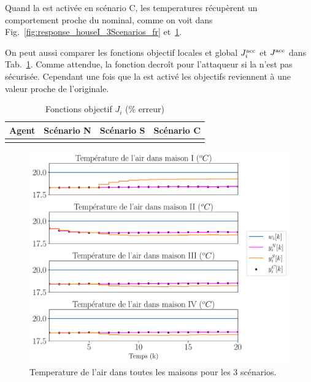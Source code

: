 \documentclass[../main.tex]{subfiles}
\begin{document}
Quand la \rpdmpcss{} est activée en scénario C, les temperatures récupèrent un comportement proche du nominal, comme on voit dans Fig.~\ref{fig:response_houseI_3Scenarios_fr} et~\ref{fig:response_housesII_to_IV_3Scenarios_fr}.


On peut aussi comparer les fonctions objectif locales et global $J_{i}^{\text{acc}}$ et $J^{\text{acc}}$ dans Tab.~\ref{tab:eq_costsGlobalLocal_fr}.
Comme attendue, la fonction decroît pour l'attaqueur si la \dmpc{} n'est pas sécurisée. Cependant une fois que la \rpdmpcss{} est activé les objectifs reviennent à une valeur proche de l'originale.

\begin{table}[h]
  \centering
  \caption{Fonctions objectif $J_{i}$ (\% erreur)}\label{tab:eq_costsGlobalLocal_fr}
  \begin{tabular}[t]{cccc}
    \toprule
    Agent  & Scénario N& Scénario S & Scénario C\\
    \midrule
    \\
    \bottomrule
  \end{tabular}
\end{table}

\begin{figure}[H]
  \centering
 \includegraphics[width=.7\textwidth,trim=0 .3cm 0 .2cm,clip]{../img/resilient_eq/ErrorWX_command_normErrH_all_houses_fr.pdf}
  \caption{Temperature de l'air dans toutes les maisons pour les 3 scénarios.}\label{fig:response_housesII_to_IV_3Scenarios_fr}
\end{figure}
\end{document}
